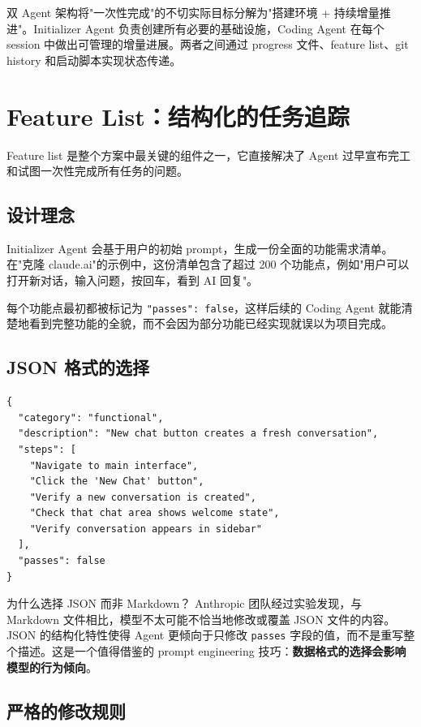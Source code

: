 \documentclass[a4paper]{article}
\begin{document}
双 Agent 架构将"一次性完成"的不切实际目标分解为"搭建环境 + 持续增量推进"。Initializer Agent 负责创建所有必要的基础设施，Coding Agent 在每个 session 中做出可管理的增量进展。两者之间通过 progress 文件、feature list、git history 和启动脚本实现状态传递。


\section{Feature List：结构化的任务追踪}

Feature list 是整个方案中最关键的组件之一，它直接解决了 Agent 过早宣布完工和试图一次性完成所有任务的问题。

\subsection{设计理念}

Initializer Agent 会基于用户的初始 prompt，生成一份全面的功能需求清单。在"克隆 claude.ai"的示例中，这份清单包含了超过 200 个功能点，例如"用户可以打开新对话，输入问题，按回车，看到 AI 回复"。

每个功能点最初都被标记为 \texttt{"passes": false}，这样后续的 Coding Agent 就能清楚地看到完整功能的全貌，而不会因为部分功能已经实现就误以为项目完成。

\subsection{JSON 格式的选择}

\begin{lstlisting}[language={}, caption={Feature list 中单个功能的 JSON 结构}]
{
  "category": "functional",
  "description": "New chat button creates a fresh conversation",
  "steps": [
    "Navigate to main interface",
    "Click the 'New Chat' button",
    "Verify a new conversation is created",
    "Check that chat area shows welcome state",
    "Verify conversation appears in sidebar"
  ],
  "passes": false
}
\end{lstlisting}

\begin{importantbox}{为什么选择 JSON 而非 Markdown？}
Anthropic 团队经过实验发现，与 Markdown 文件相比，模型不太可能不恰当地修改或覆盖 JSON 文件的内容。JSON 的结构化特性使得 Agent 更倾向于只修改 \texttt{passes} 字段的值，而不是重写整个描述。这是一个值得借鉴的 prompt engineering 技巧：\textbf{数据格式的选择会影响模型的行为倾向}。
\end{importantbox}

\subsection{严格的修改规则}
\end{document}
